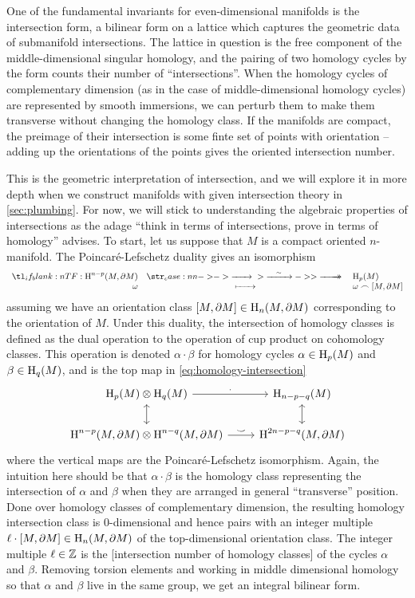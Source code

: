 One of the fundamental invariants for even-dimensional manifolds is the intersection form, a bilinear form on a lattice which captures the geometric data of submanifold intersections. The lattice in question is the free component of the middle-dimensional singular homology, and the pairing of two homology cycles by the form counts their number of ``intersections''. When the homology cycles of complementary dimension (as in the case of middle-dimensional homology cycles) are represented by smooth immersions, we can perturb them to make them transverse without changing the homology class. If the manifolds are compact, the preimage of their intersection is some finte set of points with orientation -- adding up the orientations of the points gives the oriented intersection number.

This is the geometric interpretation of intersection, and we will explore it in more depth when we construct manifolds with given intersection theory in \cref{sec:plumbing}. For now, we will stick to understanding the algebraic properties of intersections as the adage ``think in terms of intersections, prove in terms of homology'' advises. To start, let us suppose that $M$ is a compact oriented $n$-manifold.
The Poincar\'e-Lefschetz duality gives an isomorphism
\begin{equation}
	\lkxfunc{}{\H^{n-p}(M,\partial M)}{\H_p(M)}{\omega}{\omega\frown [M,\partial M]}
\end{equation}
assuming we have an orientation class $[M,\partial M]\in \operatorname{H}_n(M, \partial M)$ corresponding to the orientation of $M$. Under this duality, the intersection of homology classes is defined as the dual operation to the operation of cup product on cohomology classes. This operation is denoted $\alpha\cdot \beta$ for homology cycles $\alpha\in \operatorname{H}_p(M)$ and $\beta\in \operatorname{H}_q(M)$, and is the top map in \cref{eq:homology-intersection}
\begin{equation}\label{eq:homology-intersection}
	\begin{tikzcd}
		{\H_p(M)\otimes \H_q(M)} & {\H_{n-p-q}(M)} \\
		{\H^{n-p}(M, \partial M)\otimes \H^{n-q}(M,\partial M)} & {\H^{2n-p-q}(M,\partial M)}
		\arrow["\tnsv", from=1-1, to=1-2]
		\arrow[leftrightarrow, from=1-1, to=2-1]
		\arrow[leftrightarrow, from=1-2, to=2-2]
		\arrow["\smile", from=2-1, to=2-2]
	\end{tikzcd}
\end{equation}
where the vertical maps are the Poincar\'e-Lefschetz isomorphism. Again, the intuition here should be that $\alpha\cdot \beta$ is the homology class representing the intersection of $\alpha$ and $\beta$ when they are arranged in general ``transverse'' position. Done over homology classes of complementary dimension, the resulting homology intersection class is 0-dimensional and hence pairs with an integer multiple $\ell\cdot [M, \partial M]\in \operatorname{H}_n(M,\partial M)$ of the top-dimensional orientation class. The integer multiple $\ell\in \mathbb{Z}$ is the [intersection number of homology classes] of the cycles $\alpha$ and $\beta$. Removing torsion elements and working in middle dimensional homology so that $\alpha$ and $\beta$ live in the same group, we get an integral bilinear form.

